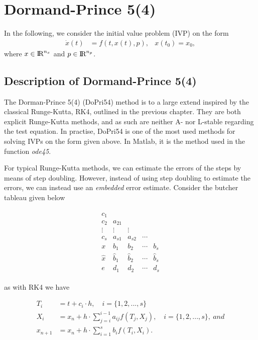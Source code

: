 \chapter{Dormand-Prince 5(4)}
In the following, we consider the initial value problem (IVP) on the form
\begin{align}
    \dot{x}(t) &= f(t,x(t),p), & x(t_0) = x_0,
\end{align}
where $x \in \text{I\kern-0.15em R} ^{n_x}$ and $p \in \text{I\kern-0.15em R} ^{n_p}$. 

\section{Description of Dormand-Prince 5(4)}
The Dorman-Prince 5(4) (DoPri54) method is to a large extend inspired by the classical Runge-Kutta, RK4, outlined in the previous chapter. They are both explicit Runge-Kutta methods, and as such are neither A- nor L-stable regarding the test equation. In practise, DoPri54 is one of the most used methods for solving IVPs on the form given above. In Matlab, it is the method used in the function \textit{ode45}. 

For typical Runge-Kutta methods, we can estimate the errors of the steps by means of step doubling. However, instead of using step doubling to estimate the errors, we can instead use an \textit{embedded} error estimate. Consider the butcher tableau given below

\begin{align}
    \begin{array}{c|cccc}
         c_1 & & & &   \\
         c_2 & a_{21} & & & \\
         \vdots & \vdots  & \vdots & & \\
         c_s & a_{s1} & a_{s2} & \cdots & \\ \hline 
         x & b_1 & b_2 & \cdots & b_s \\
         \hat{x} & \hat b_1 &  \hat b_2 & \cdots & \hat b_s \\ \hline
         e & d_1 & d_2 & \cdots & d_s
    \end{array}
\end{align}

as with RK4 we have 

\begin{align}
    T_i &= t+c_i \cdot h, \quad i = \{1,2,...,s\}\\
    X_i &= x_n + h \cdot \sum_{j=i}^{i-1} a_{ij} f(T_j, X_j), \quad i = \{1,2,...,s\}, \ and \\
    x_{n+1} &= x_n + h \cdot \sum_{i=1}^s b_i f(T_i,X_i).
\end{align}

